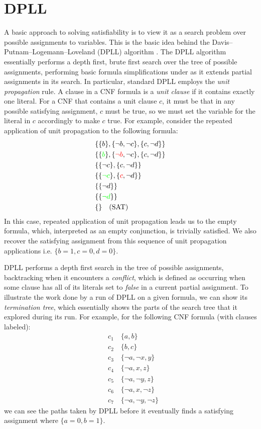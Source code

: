 \documentclass[12pt]{article}
\begin{document}
\section{DPLL}

A basic approach to solving satisfiability is to view it as a search problem over possible assignments to variables. This is the basic idea behind the Davis–Putnam–Logemann–Loveland (DPLL) algorithm \cite{dpll1961}. The DPLL algorithm essentially performs a depth first, brute first search over the tree of possible assignments, performing basic formula simplifications under as it extends partial assignments in its search. In particular, standard DPLL employs the \textit{unit propagation} rule. A clause in a CNF formula is a \textit{unit clause} if it contains exactly one literal. For a CNF that contains a unit clause $c$, it must be that in any possible satisfying assignment, $c$ must be true, so we must set the variable for the literal in $c$ accordingly to make $c$ true. For example, consider the repeated application of unit propagation to the following formula:
\begin{align*}
    &\{\{b\}, \{\neg b, \neg c\}, \{c, \neg d\}\}\\
    &\{\{\textcolor{green}{b}\}, \{\textcolor{red}{\neg b}, \neg c\}, \{c, \neg d\}\}\\
    &\{\{\neg c\}, \{c, \neg d\}\} \\
    &\{\{\textcolor{green}{\neg c}\}, \{\textcolor{red}{c}, \neg d\}\}\\
    &\{\{\neg d\}\}\\
    &\{\{\textcolor{green}{\neg d}\}\}\\
    &\{\} \quad (\text{SAT})
\end{align*}
In this case, repeated application of unit propagation leads us to the empty formula, which, interpreted as an empty conjunction, is trivially satisfied. We also recover the satisfying assignment from this sequence of unit propagation applications i.e. $\{b=1,c=0,d=0\}$.

DPLL performs a depth first search in the tree of possible assignments, backtracking when it encounters a \textit{conflict}, which is defined as occurring when some clause has all of its literals set to \textit{false} in a current partial assignment. To illustrate the work done by a run of DPLL on a given formula, we can show its \textit{termination tree}, which essentially shows the parts of the search tree that it explored during its run. For example, for the following CNF formula (with clauses labeled):
\begin{align*}
    &c_1 \quad \{a,b\}\\
    &c_2 \quad \{b,c\}\\
    &c_3 \quad \{\neg a, \neg x, y\} \\
    &c_4 \quad \{\neg a, x, z\} \\
    &c_5 \quad \{\neg a, \neg y, z\} \\
    &c_6 \quad \{\neg a, x, \neg z\} \\
    &c_7 \quad \{\neg a, \neg y, \neg z\}
\end{align*}
we can see the paths taken by DPLL before it eventually finds a satisfying assignment where $\{a=0,b=1\}$.
\end{document}
